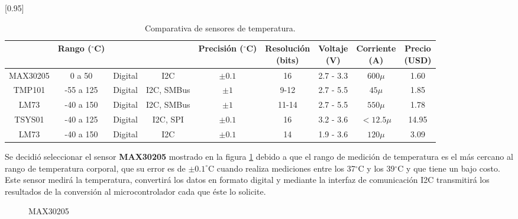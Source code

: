 		\begin{table}[htbp!]
			\begin{center}
			\scalebox{0.85}[0.95]{
			\begin{tabular}{|c|c|c|c|c|c|c|c|c|}
				\hline
				\thead{Modelo}&\thead{Rango \\ ($^{\circ}$C)}&\thead{Tipo}&\thead{Interfaz}&\thead{Precisión \\ ($^{\circ}$C)}&\thead{Resolución \\ (bits)}&\thead{Voltaje \\ (V)}&\thead{Corriente \\ (A)}&\thead{Precio \\ (USD)}\\
				\hline
				\hline
				MAX30205 & 0 a 50 & Digital& I2C& $\pm0.1$ &16 & 2.7 - 3.3&$600\mu$&1.60 \\
				\hline
				TMP101 & -55 a 125 & Digital& I2C, SMBus& $\pm1$ &9-12 & 2.7 - 5.5&$45\mu$&1.85 \\
				\hline
				LM73 & -40 a 150 & Digital& I2C, SMBus& $\pm1$ &11-14 & 2.7 - 5.5&$550\mu$&1.78 \\
				\hline
				TSYS01 & -40 a 125 & Digital& I2C, SPI& $\pm0.1$ &16 & 3.2 - 3.6&$< 12.5\mu$&14.95 \\
				\hline
				LM73 & -40 a 150 & Digital& I2C& $\pm0.1$ &14 & 1.9 - 3.6&$120\mu$&3.09 \\
				\hline
			\end{tabular}}
			\caption{Comparativa de sensores de temperatura.}
			\label{analisis:sensorTemperatura}
			\end{center}
		\end{table}
\pagebreak

Se decidió seleccionar el sensor \textbf{MAX30205} mostrado en la figura \ref{fig:AnalisisMax30205} debido a que el rango de medición de temperatura es el más cercano al rango de temperatura corporal, que su error es de $\pm0.1^{\circ}$C cuando realiza mediciones entre los 37$^{\circ}$C y los 39$^{\circ}$C y que tiene un bajo costo. \\

Este sensor medirá la temperatura, convertirá los datos en formato digital y mediante la interfaz de comunicación I2C transmitirá los resultados de la conversión al microcontrolador cada que éste lo solicite.\\

		\begin{figure}[htbp!]
			\centering
			\caption{MAX30205}
			\label{fig:AnalisisMax30205}
		\end{figure}
	\clearpage
